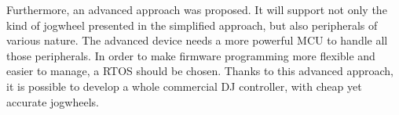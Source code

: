 \documentclass[a4paper,10pt]{article}
\begin{document}
\begin{multicols}{2}
Furthermore, an advanced approach was proposed. It will support not only the
kind of jogwheel presented in the simplified approach, but also peripherals of
various nature. The advanced device needs a more powerful MCU to handle all
those peripherals. In order to make firmware programming more flexible and
easier to manage, a RTOS should be chosen. Thanks to this advanced approach,
it is possible to develop a whole commercial DJ controller, with cheap yet
accurate jogwheels.





\end{multicols}
\end{document}
